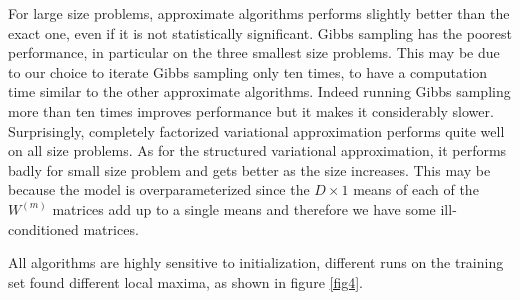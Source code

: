\documentclass{article}
\begin{document}
For large size problems, approximate algorithms performs slightly better than the exact one, even if it is not statistically significant. Gibbs sampling has the poorest performance, in particular on the three smallest size problems. This may be due to our choice to iterate Gibbs sampling only ten times,  to have a computation time similar to the other approximate algorithms. Indeed running Gibbs sampling more than ten times improves performance but it makes it considerably slower. Surprisingly, completely factorized variational approximation performs quite well on all
size problems. As for the structured variational approximation, it performs badly for small size problem and gets better as the size increases. This may be because the model is overparameterized since the $D \times 1$ means of each of the $W^{(m)}$ matrices add up to a single means and therefore we have some ill-conditioned matrices.

All algorithms are highly sensitive to initialization, different runs on the training set found different local maxima, as shown in figure \ref{fig4}.
\end{document}
